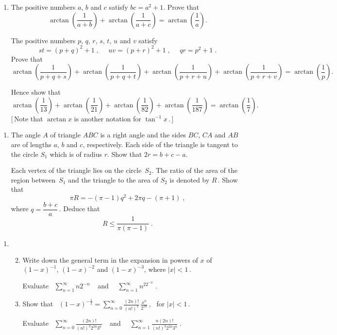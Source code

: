 \documentclass[a4, 11pt]{report}
\newlength{\qspace}
\newcounter{qnumber}
\newenvironment{question}%
 {\vspace{\qspace}
  \begin{enumerate}[\bfseries 1\quad][10]%
    \setcounter{enumi}{\value{qnumber}}%
    \item%
 }
{
  \end{enumerate}
  \filbreak
  \stepcounter{qnumber}
 }
\newenvironment{questionparts}[1][1]%
 {
  \begin{enumerate}[\bfseries (i)]%
    \setcounter{enumii}{#1}
    \addtocounter{enumii}{-1}
    \setlength{\itemsep}{5mm}
    \setlength{\parskip}{8pt}
 }
 {
  \end{enumerate}
 }
\def\le{\leqslant}
\newcommand{\ds}{\displaystyle}
\begin{document}
\begin{question}
The positive numbers $a$, $b$ and $c$ satisfy
$bc=a^2+1$. Prove that
$$
\arctan\left(\frac1  {a+b}\right)+
\arctan\left(\frac1 {a+c}\right)=
\arctan\left(\frac1 a   \right).
$$

The positive numbers $p$, $q$, $r$, $s$, $t$, $u$ and $v$ satisfy
$$
st = (p+q)^2 + 1 \;, \ \ \ \ \ \ uv=(p+r)^2 + 1 \;, \ \ \ \ \ \ 
qr = p^2+1\;.
$$
Prove that 
$$
\arctan  \! \!\left(\!\frac1 {p+q+s}\!\right)  + 
\arctan  \! \!\left(\!\frac 1{p+q+t}\!\right)   + 
\arctan  \! \!\left(\!\frac 1 {p+r+u}\!\right)  + 
\arctan  \! \!\left(\!\frac1  {p+r+v}\!\right) 
=\arctan \! \!\left(    \! \frac1 p \! \right) .
$$ 

Hence show that
$$
\arctan\left(\frac1  {13}\right)
+\arctan\left(\frac1 {21}\right)
+\arctan\left(\frac1  {82}\right)
+\arctan\left(\frac1 {187}\right)
=\arctan\left(\frac1  {7}\right).
$$
[\,Note that $\arctan x$ is another notation for $ \tan^{-1}x \,.\,$] 
\end{question}

\begin{question}
 The angle $A$ of triangle $ABC$ is a right angle and the sides
$BC$, $CA$ and $AB$ are  of lengths $a$, $b$ and $c$,
respectively.  
Each side of the triangle is  tangent to the circle $S_1$ which is
of radius $r$.
Show that $2r = b+c-a$.



Each vertex of the triangle 
lies on the circle~$S_2$.
The ratio of  the area  of the  region between~$S_1$ 
and the triangle to the area of $S_2$ is denoted by $R\,$. 
Show that 
$$
\pi R = -(\pi-1)q^2 + 2\pi q -(\pi+1) \;,
$$
where  $q=\dfrac{b+c}a\,$.
Deduce that 
$$
R\le \frac1 {\pi( \pi - 1)} \;.
$$
	\end{question}
	
\begin{question}
\begin{questionparts}
\item  Write down the general term in the expansion
in  powers of $x$ 
of  $(1-x)^{-1}$,  $(1-x)^{-2}$ and   $(1-x)^{-3}$, where
 $\vert x \vert <1\,$.

Evaluate \
$\ds \sum_{n=1}^\infty n 2^{-n}\;$ \ 
and \ \
$\ds \sum_{n=1}^\infty n^22^{-n}\;$.

\item   Show that 
\ 
$\ds (1-x)^{-\frac12} = \sum_{n=0}^\infty \frac{(2n)!}{(n!)^2} \, 
\frac{x^n}{2^{2n}}\,$, \ for $\vert x \vert <1\,$.

Evaluate \
  $\ds \sum_{n=0}^\infty \frac{(2n)!} {(n!)^2 2^{2n}3^{n}}\; $ \ and \ \ 
$\ds \sum_{n=1}^\infty \frac{n(2n)!} {(n!)^2 2^{2n}3^{n}}\; $.


\end{questionparts}
\end{question}
	
\end{document}
